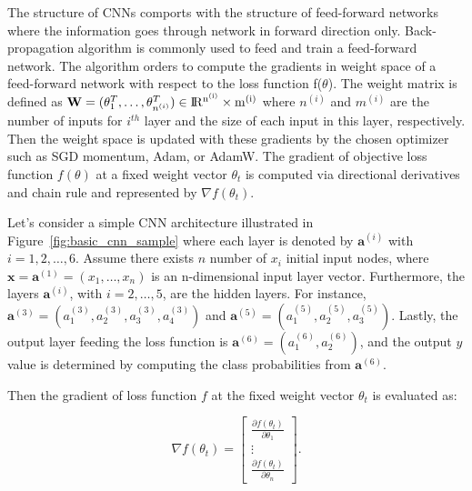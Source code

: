 The structure of CNNs comports with the structure of feed-forward networks where the information goes through network in forward direction only. Back-propagation algorithm is commonly used to feed and train a feed-forward network. The algorithm orders to compute the gradients in weight space of a feed-forward network with respect to the loss function f(\textbf{$\theta$}). The weight matrix is defined as $\textbf{W} =(\theta_{1}^{T}, \dots ,\theta_{n^{(i)}}^{T}) \in \rm I\!R^{n^{(i)}} \times m^{(i)}$ where $n^{(i)}$ and $m^{(i)}$ are the number of inputs for $i^{th}$ layer and the size of each input in this layer, respectively. Then the weight space is updated with these gradients by the chosen optimizer such as SGD momentum, Adam, or AdamW. The gradient of objective loss function $f(\textbf{$\theta$})$ at a fixed weight vector \textbf{$\theta_{t}$} is computed via directional derivatives and chain rule and represented by $\nabla f(\textbf{$\theta_{t}$})$.

Let's consider a simple CNN architecture illustrated in Figure~\ref{fig:basic_cnn_sample} where each layer is denoted by    
$\textbf{a}^{(i)}$ with $i=1,2, \ldots, 6$. Assume there exists $n$ number of $x_{i}$ initial input nodes, where $\textbf{x} = \textbf{a}^{(1)} = (x_{1}, \dots , x_{n})$ is an n-dimensional input layer vector. 
Furthermore, the layers $\textbf{a}^{(i)}$, with $i=2, \ldots, 5$, are the hidden layers. For instance, $\textbf{a}^{(3)} = (a_{1}^{(3)}, a_{2}^{(3)}, a_{3}^{(3)}, a_{4}^{(3)})$ and $\textbf{a}^{(5)} = (a_{1}^{(5)}, a_{2}^{(5)}, a_{3}^{(5)})$. Lastly, the output layer feeding the loss function is $\textbf{a}^{(6)} = (a_{1}^{(6)}, a_{2}^{(6)})$, and the output $y$ value is determined by computing the class probabilities from $\textbf{a}^{(6)}$.
 
Then the gradient of loss function $f$ at the fixed weight vector $\theta_{t}$ is evaluated as:

\begin{equation}
\nabla f (\theta_{t}) = 
    \begin{bmatrix}
        \frac { \partial f (\theta_{t})} {\partial \theta_{1}}\\
        \vdots \\
        \frac { \partial f (\theta_{t})} {\partial \theta_{n}}
    \end{bmatrix}.    
\end{equation} 

